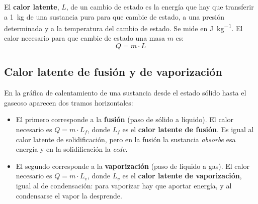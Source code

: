 \begin{definition}
    El \textbf{calor latente}, \(L\), de un cambio de estado es la energía que hay que transferir a \qty{1}{\kg} de una sustancia pura para que cambie de estado, a una presión determinada y a la temperatura del cambio de estado. Se mide en \unit{\joule\per\kg}. El calor necesario para que cambie de estado una masa \(m\) es:
    \[ \boxed{Q = m \cdot L} \]
\end{definition}

\subsection{Calor latente de fusión y de vaporización}

En la gráfica de calentamiento de una sustancia desde el estado sólido hasta el gaseoso aparecen dos tramos horizontales:
\begin{itemize}
    \item El primero corresponde a la \textbf{fusión} (paso de sólido a líquido). El calor necesario es \(Q = m \cdot L_f\), donde \(L_f\) es el \textbf{calor latente de fusión}. Es igual al calor latente de solidificación, pero en la fusión la sustancia \emph{absorbe} esa energía y en la solidificación la \emph{cede}.
    \item El segundo corresponde a la \textbf{vaporización} (paso de líquido a gas). El calor necesario es \(Q = m \cdot L_v\), donde \(L_v\) es el \textbf{calor latente de vaporización}, igual al de condensación: para vaporizar hay que aportar energía, y al condensarse el vapor la desprende.
\end{itemize}

